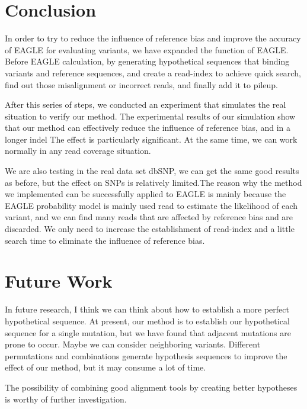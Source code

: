 \hspace{24pt}

\section{Conclusion}
In order to try to reduce the influence of reference bias and improve the accuracy of EAGLE for evaluating variants, we have expanded the function of EAGLE. Before EAGLE calculation, by generating hypothetical sequences that binding variants and reference sequences, and create a read-index to achieve quick search, find out those misalignment or incorrect reads, and finally add it to pileup.

After this series of steps, we conducted an experiment that simulates the real situation to verify our method. The experimental results of our simulation show that our method can effectively reduce the influence of reference bias, and in a longer indel The effect is particularly significant. At the same time, we can work normally in any read coverage situation.

We are also testing in the real data set dbSNP, we can get the same good results as before, but the effect on SNPs is relatively limited.The reason why the method we implemented can be successfully applied to EAGLE is mainly because the EAGLE probability model is mainly used read to estimate the likelihood of each variant, and we can find many reads that are affected by reference bias and are discarded. We only need to increase the establishment of read-index and a little search time to eliminate the influence of reference bias.

\section{Future Work}
In future research, I think we can think about how to establish a more perfect hypothetical sequence. At present, our method is to establish our hypothetical sequence for a single mutation, but we have found that adjacent mutations are prone to occur. Maybe we can consider neighboring variants. Different permutations and combinations generate hypothesis sequences to improve the effect of our method, but it may consume a lot of time.

The possibility of combining good alignment tools by creating better hypotheses is worthy of further investigation.
